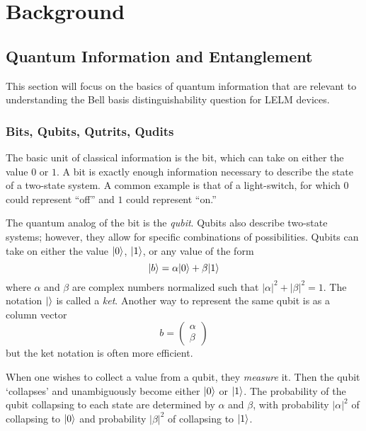 \chapter{Background}

\section{Quantum Information and Entanglement}

This section will focus on the basics of quantum information that are relevant to understanding the Bell basis distinguishability question for LELM devices.

\subsection{Bits, Qubits, Qutrits, Qudits}


The basic unit of classical information is the bit, which can take on either the value $0$ or $1$. A bit is exactly enough information necessary to describe the state of a two-state system. A common example is that of a light-switch, for which $0$ could represent ``off'' and $1$ could represent ``on.''

The quantum analog of the bit is the \textit{qubit}. Qubits also describe two-state systems; however, they allow for specific combinations of possibilities. Qubits can take on either the value $| 0 \rangle$, $| 1 \rangle$, or any value of the form
\[
| b \rangle = \alpha | 0 \rangle + \beta | 1 \rangle
\]
where $\alpha$ and $\beta$ are complex numbers normalized such that $|\alpha|^2 + |\beta|^2 = 1$. The notation $|  \rangle$ is called a \textit{ket}. Another way to represent the same qubit is as a column vector
\[b = 
\begin{pmatrix}
	\alpha \\
	\beta
\end{pmatrix}
\]
but the ket notation is often more efficient. 

When one wishes to collect a value from a qubit, they \textit{measure} it. Then the qubit `collapses' and unambiguously become either $| 0 \rangle$ or $| 1 \rangle$. The probability of the qubit collapsing to each state are determined by $\alpha$ and $\beta$, with probability $|\alpha|^2$ of collapsing to $| 0 \rangle$ and probability $|\beta|^2$ of collapsing to $| 1 \rangle$.


